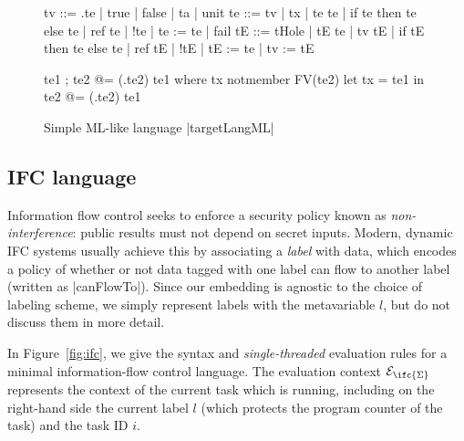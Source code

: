 \begin{figure}
\begin{code}
tv   ::= \tx.te | true | false | ta | unit
te   ::= tv | tx | te te | if te then te else te | ref te | !te | te := te | fail
tE   ::= tHole | tE te | tv tE | if tE then te else te
       | ref tE | !tE | tE := te | tv := tE 

te1 ; te2            @= (\tx.te2) te1  where  tx notmember FV(te2)
let tx = te1 in te2  @= (\tx.te2) te1
\end{code}


\caption{Simple ML-like language |targetLangML|}
\label{fig:ml}
\end{figure}

\subsection{IFC language}

Information flow control seeks to enforce a security policy known as
\emph{non-interference}: public results must not depend on secret inputs.
Modern, dynamic IFC systems usually achieve this by associating a \emph{label}
with data, which encodes a policy of whether or not data tagged with one
label can flow to another label (written as |canFlowTo|).
Since our embedding is agnostic
to the choice of labeling scheme, we simply represent labels with the metavariable
$l$, but do not discuss them in more detail.

In Figure~\ref{fig:ifc}, we give the syntax and \emph{single-threaded}
evaluation rules for a minimal information-flow control language.  The
evaluation context $\mathcal{E}_{\ifc{\Sigma}}$ represents the context
of the current task which is running, including on the right-hand side
the current label $l$ (which protects the program counter of the task)
and the task ID $i$.

